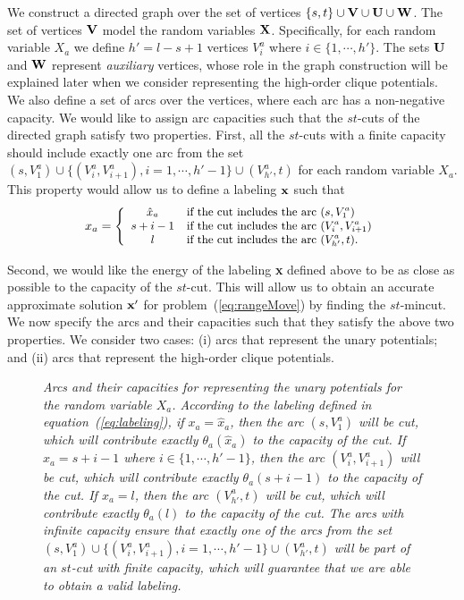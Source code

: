 \documentclass[runningheads]{llncs}
\newcommand{\imagePath}{../images}
\newcommand{\mycaption}[1]{\vspace{-1mm}\caption{#1}\vspace{-3mm}}
\begin{document}
We construct a directed graph over the set of vertices $\{s,t\} \cup {\bf V} \cup {\bf U} \cup {\bf W}$. The set of vertices ${\bf V}$ model the random variables
${\bf X}$. Specifically,
for each random variable $X_a$ we define $h'=l-s+1$ vertices $V^a_i$ where $i \in \{1,\cdots,h'\}$.
The sets ${\bf U}$ and ${\bf W}$ represent {\em auxiliary}
vertices, whose role in the graph construction will be explained later when we consider representing the high-order clique potentials. We also define a set of
arcs over the vertices, where each arc has a non-negative capacity.
We would like to assign arc capacities such that the $st$-cuts of the directed graph satisfy two properties. First, all the $st$-cuts with a finite capacity
should include exactly one arc from the set $(s,V^a_1) \cup \{(V^a_i,V^a_{i+1}), i=1,\cdots,h'-1\} \cup (V^a_{h'},t)$
for each random variable $X_a$. This property would allow us to define a labeling ${\bf x}$ such that
\begin{equation}
\small x_a = \left\{
\begin{array}{cl}
\hat{x}_a & \mbox{if the cut includes the arc } (s,V^a_1) \\
s+i-1 & \mbox{if the cut includes the arc } (V^a_i,V^a_{i+1}) \\
l & \mbox{if the cut includes the arc } (V^a_{h'},t). \\
\end{array}
\right.
\label{eq:labeling}
\end{equation}

Second, we would like the energy of the labeling {\bf x} defined above to be as close as possible to the capacity of the $st$-cut. This will allow
us to obtain an accurate approximate solution ${\bf x}'$ for problem~(\ref{eq:rangeMove}) by finding the $st$-{\sc mincut}.
We now specify the arcs and their capacities such that they
satisfy the above two properties. We consider two cases: (i) arcs that represent the unary potentials; and (ii) arcs that represent the high-order clique potentials.

\begin{figure*}
\centerline{
\psfig{file=./\imagePath/theoryFig/unary_alt.eps,width=0.6\textwidth}
}
\vspace{3mm}
\mycaption{\footnotesize \em Arcs and their capacities for representing the unary potentials for the random variable $X_a$. According to the labeling defined
in equation~(\ref{eq:labeling}), if $x_a = \hat{x}_a$, then the arc $(s,V^a_1)$ will be cut, which will contribute exactly
$\theta_a(\hat{x}_a)$ to the capacity of the cut.
If $x_a = s+i-1$ where $i \in \{1,\cdots,h'-1\}$, then the arc $(V^a_i,V^a_{i+1})$ will be cut, which will contribute
exactly $\theta_a(s+i-1)$ to the capacity of the cut. If $x_a = l$, then the arc $(V^a_{h'},t)$ will be cut, which will contribute exactly
$\theta_a(l)$ to the capacity of the cut. The arcs with infinite capacity ensure that exactly one of the arcs from the set
$(s,V^a_1) \cup \{(V^a_i,V^a_{i+1}), i=1,\cdots,h'-1\} \cup (V^a_{h'},t)$ will be part of an $st$-cut with finite capacity,
which will guarantee that we are able to obtain a valid labeling.
}
\label{fig:unary}
\end{figure*}
\end{document}
